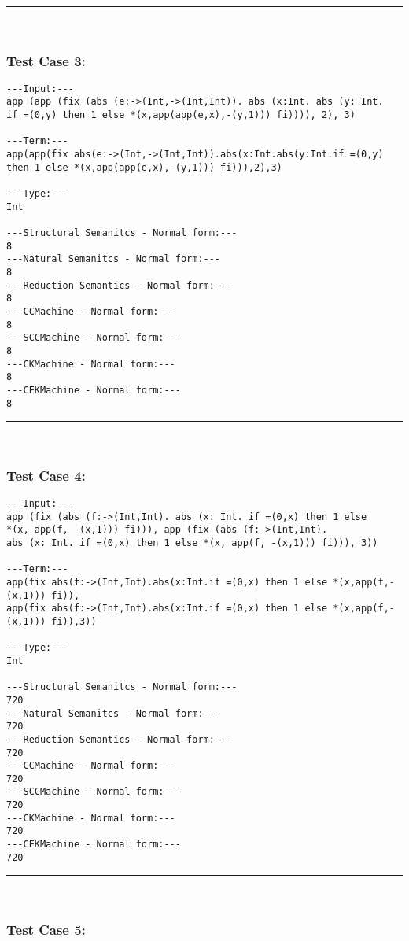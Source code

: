 \documentclass[10pt]{article}
\newcommand{\horrule}[1]{\rule{\linewidth}{#1}}
\begin{document}
\horrule{0.5pt} \\[0.2cm]	

\subsubsection*{Test Case 3:}

\begin{lstlisting}
---Input:---
app (app (fix (abs (e:->(Int,->(Int,Int)). abs (x:Int. abs (y: Int.
if =(0,y) then 1 else *(x,app(app(e,x),-(y,1))) fi)))), 2), 3)

---Term:---
app(app(fix abs(e:->(Int,->(Int,Int)).abs(x:Int.abs(y:Int.if =(0,y)
then 1 else *(x,app(app(e,x),-(y,1))) fi))),2),3)

---Type:---
Int

---Structural Semanitcs - Normal form:---
8
---Natural Semanitcs - Normal form:---
8
---Reduction Semantics - Normal form:---
8
---CCMachine - Normal form:---
8
---SCCMachine - Normal form:---
8
---CKMachine - Normal form:---
8
---CEKMachine - Normal form:---
8
\end{lstlisting}

\horrule{0.5pt} \\[0.2cm]	

\subsubsection*{Test Case 4:}

\begin{lstlisting}
---Input:---
app (fix (abs (f:->(Int,Int). abs (x: Int. if =(0,x) then 1 else
*(x, app(f, -(x,1))) fi))), app (fix (abs (f:->(Int,Int).
abs (x: Int. if =(0,x) then 1 else *(x, app(f, -(x,1))) fi))), 3))

---Term:---
app(fix abs(f:->(Int,Int).abs(x:Int.if =(0,x) then 1 else *(x,app(f,-(x,1))) fi)),
app(fix abs(f:->(Int,Int).abs(x:Int.if =(0,x) then 1 else *(x,app(f,-(x,1))) fi)),3))

---Type:---
Int

---Structural Semanitcs - Normal form:---
720
---Natural Semanitcs - Normal form:---
720
---Reduction Semantics - Normal form:---
720
---CCMachine - Normal form:---
720
---SCCMachine - Normal form:---
720
---CKMachine - Normal form:---
720
---CEKMachine - Normal form:---
720
\end{lstlisting}

\horrule{0.5pt} \\[0.2cm]	

\subsubsection*{Test Case 5:}
\end{document}
